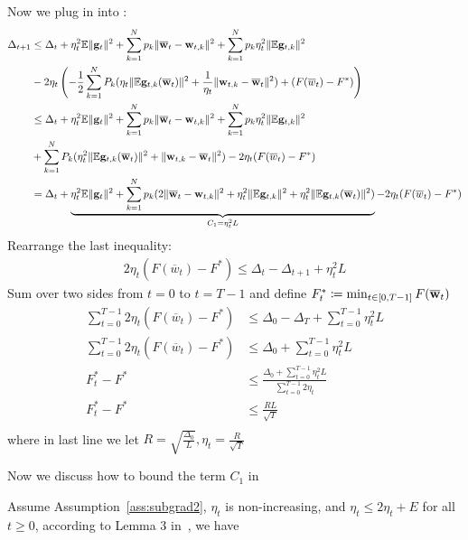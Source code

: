 Now we plug in \eq{\ref{eq:a24}} into \eq{\ref{eq:main2}}:
\begin{align}
	\Delta_{t+1} & \leq \Delta_t + 
	\eta_{t}^{2} \mathbb{E}\| {\mathbf{g}}_{t} \|^{2} + \sum_{k=1}^N p_k \|\overline{{\mathbf{w}}}_t - {\mathbf{w}}_{t,k}\|^2 +  \sum_{k=1}^N p_k \eta_t^2 \|\mathbb{E} {\mathbf{g}}_{t,k}\|^2 \\
	 &- 2 \eta_t \left(-\frac{1}{2} \sum_{k=1}^{N} P_{k} (\eta_t \|\mathbb{E} {\mathbf{g}}_{t,k}(\overline{{\mathbf{w}}}_t) \|^2 + \frac{1}{\eta_t} \|{\mathbf{w}}_{t,k} - \overline{{\mathbf{w}}}_t\|^2) + (F(\overline{w}_t) - F^*) \right)\\
	& \leq \Delta_t + 
	\eta_{t}^{2} \mathbb{E}\| {\mathbf{g}}_{t} \|^{2} + \sum_{k=1}^N p_k \|\overline{{\mathbf{w}}}_t - {\mathbf{w}}_{t,k}\|^2 +  \sum_{k=1}^N p_k \eta_t^2 \|\mathbb{E} {\mathbf{g}}_{t,k}\|^2 \\
	& +\sum_{k=1}^{N} P_{k} (\eta_t^2 \|\mathbb{E} {\mathbf{g}}_{t,k}(\overline{{\mathbf{w}}}_t) \|^2 + \|{\mathbf{w}}_{t,k} - \overline{{\mathbf{w}}}_t\|^2) - 2\eta_t (F(\overline{w}_t) - F^*)\\
	& = \Delta_t + \underbrace{\eta_{t}^{2} \mathbb{E}\| {\mathbf{g}}_{t} \|^{2} +\sum_{k=1}^N p_k  ( 2\|\overline{{\mathbf{w}}}_t - {\mathbf{w}}_{t,k}\|^2  +  \eta_t^2 \|\mathbb{E} {\mathbf{g}}_{t,k}\|^2 + \eta_t^2 \|\mathbb{E} {\mathbf{g}}_{t,k}(\overline{{\mathbf{w}}}_t) \|^2 )}_{C_1 = \eta_t^2L}  - 2\eta_t (F(\overline{w}_t) - F^*) \label{eq:main3}
\end{align}
Rearrange the last inequality:
\begin{align}
	2\eta_t (F(\overline{w}_t) - F^*) \leq \Delta_t - \Delta_{t+1} + \eta_t^2 L
\end{align}
Sum over two sides from $t=0$ to $t = T- 1$ and define $F^*_t \coloneqq \min_{t \in [0, T-1]} F(\overline{{\mathbf{w}}}_t)$
\begin{align}
	\sum_{t=0}^{T-1} 2\eta_t(F(\overline{w}_t) - F^*) & \leq \Delta_0 - \Delta_T + \sum_{t=0}^{T-1} \eta_t^2 L\\
	\sum_{t=0}^{T-1} 2\eta_t(F(\overline{w}_t) - F^*) & \leq \Delta_0 + \sum_{t=0}^{T-1} \eta_t^2 L\\
    F^*_t - F^* &\leq \frac{\Delta_0 + \sum_{t=0}^{T-1} \eta_t^2L}{ \sum_{t=0}^{T-1}  2 \eta_t}\\
    F^*_t - F^* &\leq \frac{RL}{\sqrt{T}}\\
\end{align}
where in last line we let $R = \sqrt{ \frac{\Delta_0}{L}}, \eta_t = \frac{R}{\sqrt{T}}$

Now we discuss how to bound the term $C_1$ in \eq{\ref{eq:main3}}

Assume Assumption~\ref{ass:subgrad2}, $\eta_t$ is non-increasing, and $\eta_t \leq 2\eta_t+E$ for all $t\geq 0$, according to Lemma 3 in~\cite{li2019convergence}, we have


